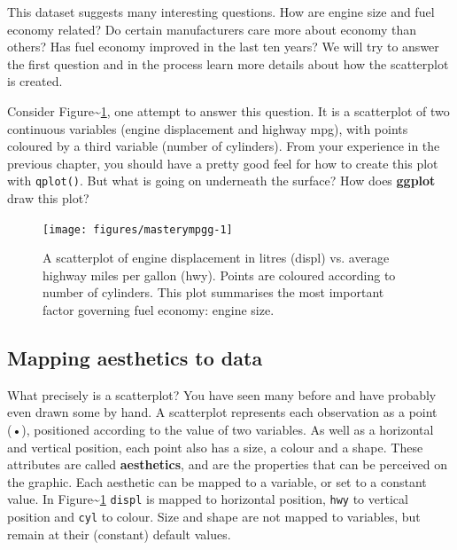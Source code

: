 This dataset suggests many interesting questions. How are engine size
and fuel economy related? Do certain manufacturers care more about
economy than others? Has fuel economy improved in the last ten years? We
will try to answer the first question and in the process learn more
details about how the scatterplot is created.


Consider Figure\textasciitilde{}\ref{fig:mpgg}, one attempt to answer
this question. It is a scatterplot of two continuous variables (engine
displacement and highway mpg), with points coloured by a third variable
(number of cylinders). From your experience in the previous chapter, you
should have a pretty good feel for how to create this plot with
\texttt{qplot()}. But what is going on underneath the surface? How does
\textbf{ggplot} draw this plot? 

\begin{Shaded}
\begin{Highlighting}[]
  
\end{Highlighting}
\end{Shaded}

\begin{figure}
\texttt{[image: figures/masterympgg-1]} \caption{A scatterplot of engine displacement in litres (displ) vs. average highway miles per gallon (hwy).  Points are coloured according to number of cylinders.  This plot summarises the most important factor governing fuel economy: engine size.\label{fig:mpgg}}
\end{figure}

\subsection{Mapping aesthetics to data}

What precisely is a scatterplot? You have seen many before and have
probably even drawn some by hand. A scatterplot represents each
observation as a point (•), positioned according to the value of two
variables. As well as a horizontal and vertical position, each point
also has a size, a colour and a shape. These attributes are called
\textbf{aesthetics}, and are the properties that can be perceived on the
graphic. Each aesthetic can be mapped to a variable, or set to a
constant value. In Figure\textasciitilde{}\ref{fig:mpgg} \texttt{displ}
is mapped to horizontal position, \texttt{hwy} to vertical position and
\texttt{cyl} to colour. Size and shape are not mapped to variables, but
remain at their (constant) default values. 

